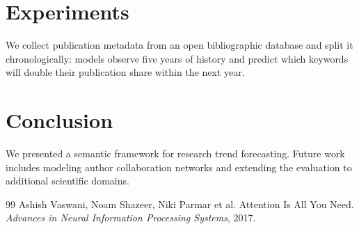 \documentclass[11pt]{article}
\begin{document}
\section{Experiments}
We collect publication metadata from an open bibliographic database and
split it chronologically: models observe five years of history and predict
which keywords will double their publication share within the next year.

\section{Conclusion}
We presented a semantic framework for research trend forecasting. Future
work includes modeling author collaboration networks and extending the
evaluation to additional scientific domains.

\begin{thebibliography}{99}
 Ashish Vaswani, Noam Shazeer, Niki Parmar et al.
Attention Is All You Need. \textit{Advances in Neural Information
Processing Systems}, 2017.
\end{thebibliography}
\end{document}
